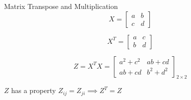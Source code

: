 \documentclass{beamer}
\begin{document}
\begin{frame}{Matrix Transpose and Multiplication}
\begin{equation*}
    X = \begin{bmatrix}
    a&b\\
    c&d
    \end{bmatrix}
\end{equation*}

\pause
\begin{equation*}
    X^{T} = \begin{bmatrix}
    a&c\\
    b&d
    \end{bmatrix}
\end{equation*}

\pause
\begin{equation*}
    Z = X^{T}X =  \begin{bmatrix}
    a^{2}+c^{2}&ab+cd\\
    ab+cd&b^{2}+d^{2}
    \end{bmatrix}_{2\times 2}
\end{equation*}

\pause
$Z$ has a property $Z_{ij}=Z_{ji} \implies Z^{T}=Z$
\end{frame}
\end{document}
